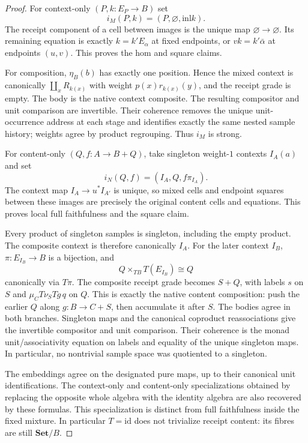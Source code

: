 \documentclass[11pt,a4paper]{article}
\theoremstyle{definition}
\newcommand{\Set}{\mathbf{Set}}
\newcommand{\id}{\mathrm{id}}
\newcommand{\inl}{\mathrm{inl}}
\begin{document}
\begin{proof}
For context-only $(P,k:E_P\to B)$ set
\[
 i_M(P,k)=(P,\varnothing,\inl k).
\]
The receipt component of a cell between images is the unique map
$\varnothing\to\varnothing$. Its remaining equation is exactly
$k=k'E_\alpha$ at fixed endpoints, or $vk=k'\bar\alpha$ at endpoints
$(u,v)$. This proves the hom and square claims.

For composition, $\eta_B(b)$ has exactly one position. Hence the mixed
context is canonically $\coprod_x R_{k(x)}$ with weight
$p(x)r_{k(x)}(y)$, and the receipt grade is empty. The body is the native
context composite. The resulting compositor and unit comparison are
invertible. Their coherence removes the unique unit-occurrence address
at each stage and identifies exactly the same nested sample history;
weights agree by product regrouping. Thus $i_M$ is strong.

For content-only $(Q,f:A\to B+Q)$, take singleton weight-$1$ contexts
$I_A(a)$ and set
\[
 i_N(Q,f)=(I_A,Q,f\pi_{I_A}).
\]
The context map $I_A\to u^*I_{A'}$ is unique, so mixed cells and endpoint
squares between these images are precisely the original content cells
and equations. This proves local full faithfulness and the square claim.

Every product of singleton samples is singleton, including the empty
product. The composite context is therefore canonically $I_A$.
For the later context $I_B$, $\pi:E_{I_B}\to B$ is a bijection, and
\[
 Q\times_{TB}T(E_{I_B})\cong Q
\]
canonically via $T\pi$. The composite receipt grade becomes $S+Q$,
with labels $s$ on $S$ and $\mu_C T\nu_S Tg\,q$ on $Q$.
This is exactly the native content composition: push the earlier $Q$
along $g:B\to C+S$, then accumulate it after $S$. The bodies agree in
both branches. Singleton maps and the canonical coproduct reassociations
give the invertible compositor and unit comparison. Their coherence is
the monad unit/associativity equation on labels and equality of the unique
singleton maps. In particular, no nontrivial sample space was quotiented
to a singleton.

The embeddings agree on the designated pure maps, up to their canonical
unit identifications. The context-only and content-only specializations
obtained by replacing the opposite whole algebra with the identity algebra
are also recovered by these formulas. This specialization is distinct from
full faithfulness inside the fixed mixture. In particular $T=\id$ does
not trivialize receipt content: its fibres are still $\Set/B$.
\end{proof}
\end{document}
